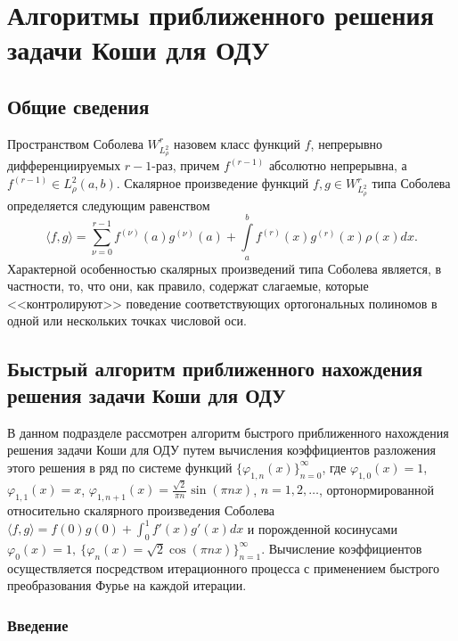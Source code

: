 
\chapter{Алгоритмы приближенного решения задачи Коши для ОДУ}

\section{Общие сведения}
Пространством Соболева $W^r_{L^{2}_\rho}$  назовем класс функций $f$, непрерывно дифференциируемых $r-1$-раз, причем $f^{(r-1)}$ абсолютно непрерывна, а $f^{(r-1)}\in L^2_\rho(a,b)$. Скалярное произведение функций $f,g\in W^r_{L^{2}_\rho}$ типа Соболева определяется следующим равенством
\begin{equation*}
  \langle f,g\rangle = \sum\limits_{\nu=0}^{r-1}f^{(\nu)}(a)g^{(\nu)}(a)+\int\limits_a^b f^{(r)}(x)g^{(r)}(x)\rho(x)dx.
\end{equation*}
Характерной особенностью скалярных  произведений типа Соболева является, в частности, то, что они, как правило,  содержат слагаемые, которые <<контролируют>> поведение соответствующих ортогональных полиномов в одной или нескольких точках числовой оси.


\section{Быстрый алгоритм приближенного нахождения решения задачи Коши для ОДУ}


В данном подразделе рассмотрен алгоритм быстрого приближенного нахождения решения задачи Коши для ОДУ путем вычисления коэффициентов разложения этого решения в ряд по системе функций $\{\varphi_{1,n}(x)\}_{n=0}^{\infty}$, где $ \varphi_{1,0}(x)=1$, $\varphi_{1,1}(x)=x$, $\varphi_{1,n+1}(x)=\frac{\sqrt{2}}{\pi n}\sin(\pi nx)$, $n=1,2,\ldots$,
ортонормированной относительно скалярного произведения Соболева $\langle f, g\rangle=f(0)g(0)+\int_0^1f'(x)g'(x)dx$ и порожденной
косинусами $\varphi_0(x)=1,\ \{\varphi_n(x)=\sqrt{2}\cos(\pi nx)\}_{n=1}^\infty$.
Вычисление коэффициентов осуществляется посредством итерационного процесса с применением быстрого преобразования Фурье на каждой итерации.


\subsection{Введение}


